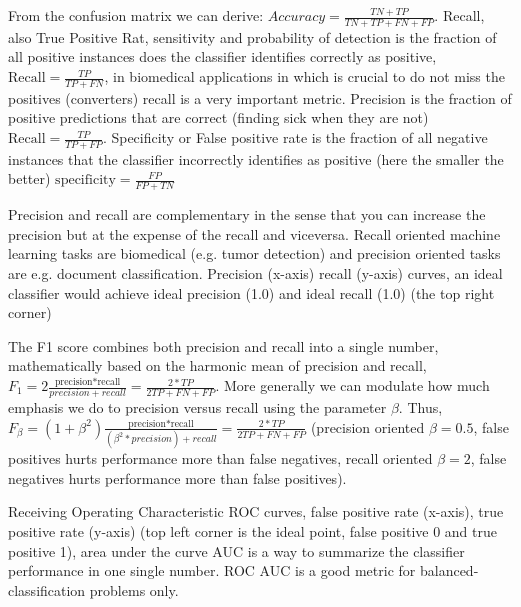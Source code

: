 \documentclass[12pt]{report}
\begin{document}
From the confusion matrix we can derive:
$\textit{Accuracy} = \frac{TN + TP}{TN+TP+FN+FP}$. 
Recall, also True Positive Rat, sensitivity and probability of detection  is the fraction of all positive instances does the classifier identifies correctly as positive, $\text{Recall} = \frac{TP}{TP+FN}$, in biomedical applications in which is crucial to do not miss the positives (converters) recall is a very important metric.
Precision is the fraction of positive predictions that are correct (finding sick when they are not) $\text{Recall} = \frac{TP}{TP+FP}$.
Specificity or False positive rate is the fraction of all negative instances that the classifier incorrectly identifies as positive (here the smaller the better)  $\text{specificity} = \frac{FP}{FP+TN}$

Precision and recall are complementary in the sense that you can increase the precision but at the expense of the recall and viceversa. Recall oriented machine learning tasks are biomedical (e.g. tumor detection) and precision oriented tasks are e.g. document classification. Precision (x-axis) recall (y-axis) curves, an ideal classifier would achieve ideal precision (1.0) and ideal recall (1.0) (the top right corner) 

The F1 score combines both precision and recall into a single number, mathematically based on the harmonic mean of precision and recall, $F_1 = 2\frac{\text{precision*recall}}{precision+recall} = \frac{2 * TP}{2TP + FN + FP}$. More generally we can modulate how much emphasis we do to precision versus recall using the parameter $\beta$. Thus, $F_\beta = (1+\beta^2)\frac{\text{precision*recall}}{(\beta^2 * precision)+recall} = \frac{2 * TP}{2TP + FN + FP}$ (precision oriented $\beta=0.5$, false positives hurts performance more than false negatives, recall oriented $\beta=2$, false negatives hurts performance more than false positives).

Receiving Operating Characteristic ROC curves, false positive rate (x-axis), true positive rate (y-axis) (top left corner is the ideal point, false positive 0 and true positive 1), area under the curve AUC is a way to summarize the classifier performance in one single number. ROC AUC is a good metric for balanced-classification problems only.
\end{document}
